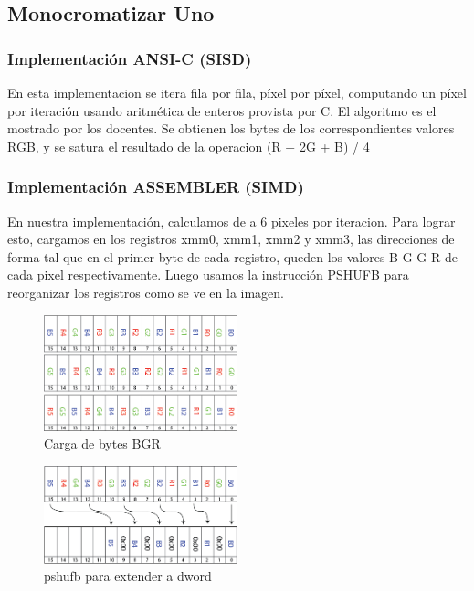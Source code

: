         \subsection{Monocromatizar Uno}
            \subsubsection{Implementación ANSI-C (SISD)}
                En esta implementacion se itera fila por fila, píxel por píxel, computando un píxel por iteración usando aritmética de enteros provista por C. El algoritmo es el mostrado por los docentes. Se obtienen los bytes de los correspondientes valores RGB, y se satura el resultado de la operacion (R + 2G + B) / 4 
            \subsubsection{Implementación ASSEMBLER (SIMD)}
                En nuestra implementación, calculamos de a 6 pixeles por iteracion. Para lograr esto, cargamos en los registros xmm0, xmm1, xmm2 y xmm3, las direcciones de forma tal que en el primer byte de cada registro, queden los valores B G G R de cada pixel respectivamente. Luego usamos la instrucción PSHUFB para reorganizar los registros como se ve en la imagen.
                
                \begin{figure}[htb]
                \begin{center}
                \leavevmode
                \includegraphics[width=0.5\textwidth]{carga_bytes_rgb.png}
                \end{center}
                \caption{Carga de bytes BGR}
                \end{figure}
                
                \begin{figure}[htb]
                \begin{center}
                \leavevmode
                \includegraphics[width=0.5\textwidth]{gris_epsilon_uno_pshub.png}
                \end{center}
                \caption{pshufb para extender a dword}
                \end{figure}
                

